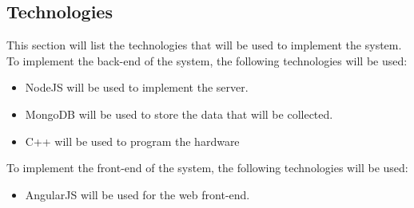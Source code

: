 \documentclass[a4paper,12pt]{article}
\begin{document}
\subsection{Technologies}
This section will list the technologies that will be used to implement the system.\\
To implement the back-end of the system, the following technologies will be used:
\begin{itemize}
    \item NodeJS will be used to implement the server.
    \item MongoDB will be used to store the data that will be collected.
    \item C++ will be used to program the hardware
\end{itemize}
To implement the front-end of the system, the following technologies will be used:
\begin{itemize}
    \item AngularJS will be used for the web front-end.
\end{itemize}
\end{document}
